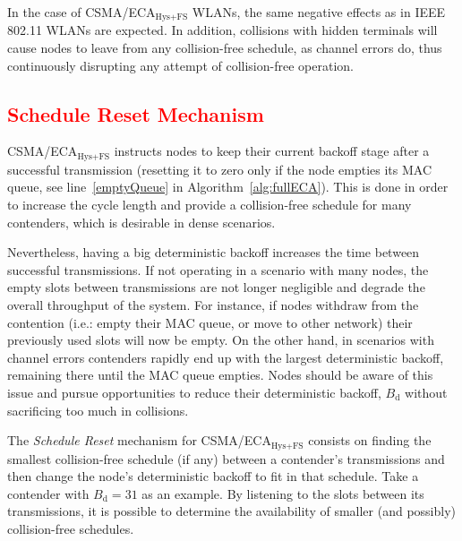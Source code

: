	In the case of CSMA/ECA$_{\text{Hys+FS}}$ WLANs, the same negative effects as in IEEE 802.11 WLANs are expected. In addition, collisions with hidden terminals will cause nodes to leave from any collision-free schedule, as channel errors do, thus continuously disrupting any attempt of collision-free operation.
	
%	
		
	\textcolor{red}{\subsection{Schedule Reset Mechanism}\label{schedReset}}
	CSMA/ECA$_{\text{Hys+FS}}$ instructs nodes to keep their current backoff stage after a successful transmission (resetting it to zero only if the node empties its MAC queue, see line~\ref{emptyQueue} in Algorithm~\ref{alg:fullECA}). This is done in order to increase the cycle length and provide a collision-free schedule for many contenders, which is desirable in dense scenarios.
	
	Nevertheless, having a big deterministic backoff increases the time between successful transmissions. If not operating in a scenario with many nodes, the empty slots between transmissions are not longer negligible and degrade the overall throughput of the system. For instance, if nodes withdraw from the contention (i.e.: empty their MAC queue, or move to other network) their previously used slots will now be empty. On the other hand, in scenarios with channel errors contenders rapidly end up with the largest deterministic backoff, remaining there until the MAC queue empties. Nodes should be aware of this issue and pursue opportunities to reduce their deterministic backoff, $B_{\text{d}}$ without sacrificing too much in collisions. 
	
	The \emph{Schedule Reset} mechanism for CSMA/ECA$_{\text{Hys+FS}}$ consists on finding the smallest collision-free schedule (if any) between a contender's transmissions and then change the node's deterministic backoff to fit in that schedule. Take a contender with $B_{\text{d}}=31$ as an example. By listening to the slots between its transmissions, it is possible to determine the availability of smaller (and possibly) collision-free schedules.
	
